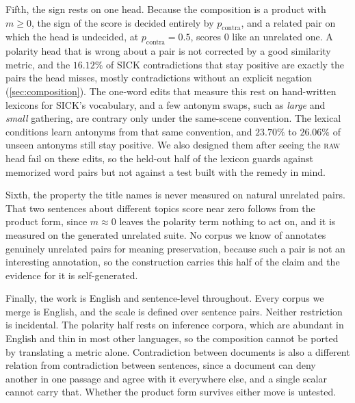 \documentclass[11pt]{article}
\begin{document}
Fifth, the sign rests on one head.
Because the composition is a product with $m \geq 0$, the sign of the score is decided entirely by $p_{\mathrm{contra}}$, and a related pair on which the head is undecided, at $p_{\mathrm{contra}} = 0.5$, scores $0$ like an unrelated one.
A polarity head that is wrong about a pair is not corrected by a good similarity metric, and the $16.12\%$ of SICK contradictions that stay positive are exactly the pairs the head misses, mostly contradictions without an explicit negation (\autoref{sec:composition}).
The one-word edits that measure this rest on hand-written lexicons for SICK's vocabulary, and a few antonym swaps, such as \emph{large} and \emph{small} gathering, are contrary only under the same-scene convention.
The lexical conditions learn antonyms from that same convention, and $23.70\%$ to $26.06\%$ of unseen antonyms still stay positive.
We also designed them after seeing the \textsc{raw} head fail on these edits, so the held-out half of the lexicon guards against memorized word pairs but not against a test built with the remedy in mind.

Sixth, the property the title names is never measured on natural unrelated pairs.
That two sentences about different topics score near zero follows from the product form, since $m \approx 0$ leaves the polarity term nothing to act on, and it is measured on the generated unrelated suite.
No corpus we know of annotates genuinely unrelated pairs for meaning preservation, because such a pair is not an interesting annotation, so the construction carries this half of the claim and the evidence for it is self-generated.

Finally, the work is English and sentence-level throughout.
Every corpus we merge is English, and the scale is defined over sentence pairs.
Neither restriction is incidental.
The polarity half rests on inference corpora, which are abundant in English and thin in most other languages, so the composition cannot be ported by translating a metric alone.
Contradiction between documents is also a different relation from contradiction between sentences, since a document can deny another in one passage and agree with it everywhere else, and a single scalar cannot carry that.
Whether the product form survives either move is untested.
\end{document}
